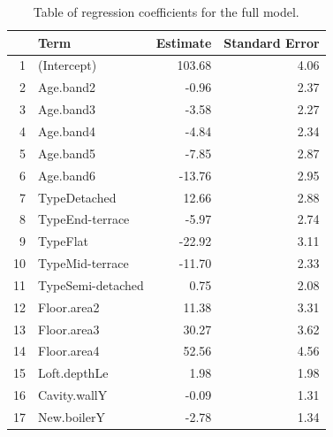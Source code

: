 \documentclass[9pt]{extarticle}
\begin{document}
\begin{table}[H]
	\centering
	\begin{tabular}{r|lrr}
		\hline
		& Term & Estimate & Standard Error \\ 
		\hline
		1 & (Intercept) & 103.68 & 4.06 \\ 
		2 & Age.band2 & -0.96 & 2.37 \\ 
		3 & Age.band3 & -3.58 & 2.27 \\ 
		4 & Age.band4 & -4.84 & 2.34 \\ 
		5 & Age.band5 & -7.85 & 2.87 \\ 
		6 & Age.band6 & -13.76 & 2.95 \\ 
		7 & TypeDetached & 12.66 & 2.88 \\ 
		8 & TypeEnd-terrace & -5.97 & 2.74 \\ 
		9 & TypeFlat & -22.92 & 3.11 \\ 
		10 & TypeMid-terrace & -11.70 & 2.33 \\ 
		11 & TypeSemi-detached & 0.75 & 2.08 \\ 
		12 & Floor.area2 & 11.38 & 3.31 \\ 
		13 & Floor.area3 & 30.27 & 3.62 \\ 
		14 & Floor.area4 & 52.56 & 4.56 \\ 
		15 & Loft.depthLe & 1.98 & 1.98 \\ 
		16 & Cavity.wallY & -0.09 & 1.31 \\ 
		17 & New.boilerY & -2.78 & 1.34 \\ 
		\hline
	\end{tabular}
\caption{Table of regression coefficients for the full model.}
\label{tab:fulmo}
\end{table}
\end{document}
